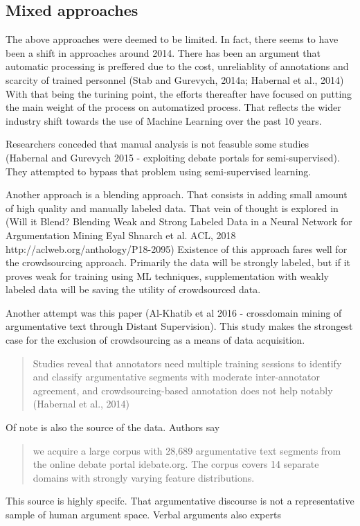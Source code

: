 \documentclass{article}
\begin{document}
\subsection{Mixed approaches}
The above approaches were deemed to be limited. In fact, there seems to have been a shift in approaches around 2014.
There has been an argument that automatic processing is preffered due to the cost, unreliablity of annotations and scarcity of trained personnel
(Stab and Gurevych, 2014a; Habernal et al., 2014)
With that being the turining point, the efforts thereafter have focused on putting the main weight of the process on automatized process. 
That reflects the wider industry shift towards the use of Machine Learning over the past 10 years.

Researchers conceded that manual analysis is not feasuble some studies (Habernal and Gurevych 2015 - exploiting debate portals for semi-supervised).
They attempted to bypass that problem using semi-supervised learning.

Another approach is a blending approach. That consists in adding small amount of high quality and manually labeled data.
That vein of thought is explored in (Will it Blend? Blending Weak and Strong Labeled Data in a Neural Network for Argumentation Mining Eyal Shnarch et al.
ACL, 2018 http://aclweb.org/anthology/P18-2095)
Existence of this approach fares well for the crowdsourcing approach. Primarily the data will be strongly labeled, but if it proves weak for training using ML techniques, 
supplementation with weakly labeled data will be saving the utility of crowdsourced data.

Another attempt was this paper (Al-Khatib et al 2016 - crossdomain mining of argumentative text through Distant Supervision).
This study makes the strongest case for the exclusion of crowdsourcing as a means of data acquisition.
\begin{quote}
 Studies reveal that annotators need multiple training sessions to identify and classify argumentative segments with moderate inter-annotator agreement, and crowdsourcing-based annotation does not help notably (Habernal et al., 2014)
\end{quote}
Of note is also the source of the data. Authors say
\begin{quote}
 we acquire a large corpus with 28,689 argumentative text segments from the online debate portal idebate.org. The corpus covers 14 separate domains with strongly varying feature distributions.
\end{quote}
This source is highly specifc. That argumentative discourse is not a representative sample of human argument space. Verbal arguments
also experts 
\end{document}
